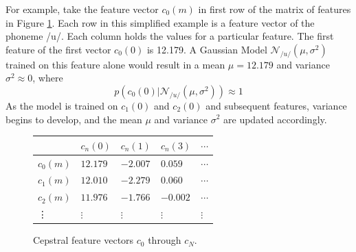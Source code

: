 For example, take the feature vector $c_0(m)$ in first row of the matrix of features in Figure \ref{fig:feat-vectors}.  Each row in this simplified example is a feature vector of the phoneme /u/.  Each column holds the values for a particular feature.  The first feature of the first vector $c_0(0)$ is 12.179.  A Gaussian Model $\mathcal{N}_{/u/}(\mu,\sigma^2)$ trained on this feature alone would result in a mean $\mu=12.179$ and variance $\sigma^2\approx 0$, where \begin{equation} p(c_0(0)|\mathcal{N}_{/u/}(\mu,\sigma^2))\approx 1 \end{equation} As the model is trained on $c_1(0)$ and $c_2(0)$ and subsequent features, variance begins to develop, and the mean $\mu$ and variance $\sigma^2$ are updated accordingly.
%
\begin{figure}[H]
\begin{center}
\begin{tabular}{|p{1.5cm}|p{1.5cm}|p{1.5cm}|p{1.5cm}|p{1cm}} \hline
    & $c_n(0)$ & $c_n(1)$ & $c_n(3)$ & $\cdots$ \\ \hline
$c_0(m)$ & $12.179$ & $-2.007$ & $0.059$ & $\cdots$ \\ \hline
$c_1(m)$ & $12.010$ & $-2.279$ & $0.060$ & $\cdots$ \\ \hline
$c_2(m)$ & $11.976$ & $-1.766$ & $-0.002$ & $\cdots$ \\ \hline
\vdots & $\vdots$ & $\vdots$ & $\vdots$ & $\vdots$ \\ 
\end{tabular}
\end{center}
\caption{Cepstral feature vectors $c_0$ through $c_N$.}\label{fig:feat-vectors}
\end{figure}


